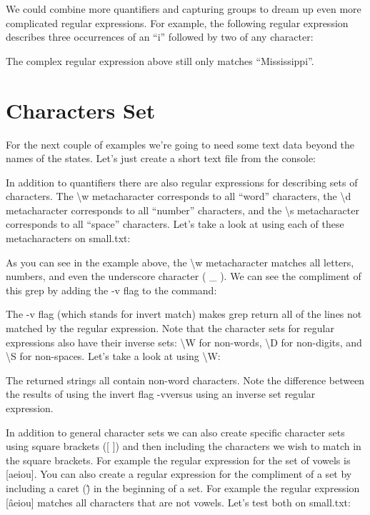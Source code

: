 We could combine more quantifiers and capturing groups to dream up even more complicated regular expressions. For example, the following regular expression describes three occurrences of an “i” followed by two of any character:

The complex regular expression above still only matches “Mississippi”.

\section{Characters Set}

For the next couple of examples we’re going to need some text data beyond the names of the states. Let’s just create a short text file from the console:

In addition to quantifiers there are also regular expressions for describing sets of characters. The \textbackslash w metacharacter corresponds to all “word” characters, the \textbackslash d metacharacter corresponds to all “number” characters, and the \textbackslash s metacharacter corresponds to all “space” characters. Let’s take a look at using each of these metacharacters on small.txt:

As you can see in the example above, the \textbackslash w metacharacter matches all letters, numbers, and even the underscore character ( \_ ). We can see the compliment of this grep by adding the -v flag to the command:

The -v flag (which stands for invert match) makes grep return all of the lines not matched by the regular expression. Note that the character sets for regular expressions also have their inverse sets: \textbackslash W for non-words, \textbackslash D for non-digits, and \textbackslash S for non-spaces. Let’s take a look at using \textbackslash W:

The returned strings all contain non-word characters. Note the difference between the results of using the invert flag -vversus using an inverse set regular expression.

In addition to general character sets we can also create specific character sets using square brackets ([ ]) and then including the characters we wish to match in the square brackets. For example the regular expression for the set of vowels is [aeiou]. You can also create a regular expression for the compliment of a set by including a caret (\^) in the beginning of a set. For example the regular expression [\^aeiou] matches all characters that are not vowels. Let’s test both on small.txt:

